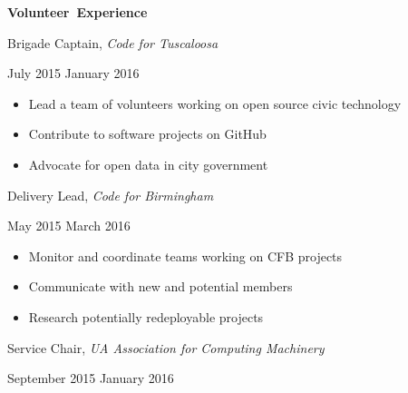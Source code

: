 \documentclass[11pt]{article}
\begin{document}
\vspace{0.8em}
\hbox{\large \textbf{Volunteer Experience}}

\begin{minipage}[t]{0.65\textwidth}
\flushleft
Brigade Captain, \textit{Code for Tuscaloosa}\\
\end{minipage}
\begin{minipage}[t]{0.30\textwidth}
\flushright
July 2015 \space \textemdash \space January 2016\\
\end{minipage}

\begin{itemize}
  \item Lead a team of volunteers working on open source civic technology
  \item Contribute to software projects on GitHub
  \item Advocate for open data in city government
\end{itemize}

\vspace{0.4em}
\begin{minipage}[t]{0.65\textwidth}
\flushleft
Delivery Lead, \textit{Code for Birmingham}\\
\end{minipage}
\begin{minipage}[t]{0.30\textwidth}
\flushright
May 2015 \space \textemdash \space March 2016\\
\end{minipage}

\begin{itemize}
  \item Monitor and coordinate teams working on CFB projects
  \item Communicate with new and potential members
  \item Research potentially redeployable projects
\end{itemize}

\vspace{0.4em}
\begin{minipage}[t]{0.65\textwidth}
\flushleft
Service Chair, \textit{UA Association for Computing Machinery}\\
\end{minipage}
\begin{minipage}[t]{0.3\textwidth}
\flushright
September 2015 \space \textemdash \space January 2016\\
\end{minipage}
\end{document}
